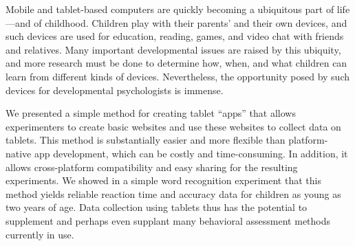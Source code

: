 \documentclass[man,noapacite]{apa2}
\begin{document}
Mobile and tablet-based computers are quickly becoming a ubiquitous part of life---and of childhood. Children play with their parents' and their own devices, and such devices are used for education, reading, games, and video chat with friends and relatives. Many important developmental issues are raised by this ubiquity, and more research must be done to determine how, when, and what children can learn from different kinds of devices. Nevertheless, the opportunity posed by such devices for developmental psychologists is immense.

We presented a simple method for creating tablet ``apps'' that allows experimenters to create basic websites and use these websites to collect data on tablets. This method is substantially easier and more flexible than platform-native app development, which can be costly and time-consuming. In addition, it allows cross-platform compatibility and easy sharing for the resulting experiments. We showed in a simple word recognition experiment that this method yields reliable reaction time and accuracy data for children as young as two years of age. Data collection using tablets thus has the potential to supplement and perhaps even supplant many behavioral assessment methods currently in use. 

\newpage



\end{document}
